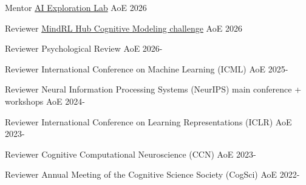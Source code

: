 
\begin{cvhonors}

 \cvhonor
    {Mentor} %
    {\href{https://ai-exploration-lab.vercel.app/}{AI Exploration Lab}} %
    {AoE} %
    {2026~~} %

    \cvhonor
    {Reviewer} %
    {\href{https://rldmjc.github.io/posts/modelingchallenge/#our-core-philosophy}{MindRL Hub Cognitive Modeling challenge}} %
    {AoE} %
    {2026~~} %

\cvhonor
    {Reviewer} %
    {Psychological Review} %
    {AoE} %
    {2026-} %
    
\cvhonor
    {Reviewer} %
    {International Conference on Machine Learning (ICML)} %
    {AoE} %
    {2025-} %

   \cvhonor
    {Reviewer} %
    {Neural Information Processing Systems (NeurIPS) main conference + workshops} %
    {AoE} %
    {2024-} %
    
  \cvhonor
    {Reviewer} %
    {International Conference on Learning Representations (ICLR)} %
    {AoE} %
    {2023-} %

    \cvhonor
    {Reviewer} %
    {Cognitive Computational Neuroscience (CCN)} %
    {AoE} %
    {2023-} %

    \cvhonor
    {Reviewer} %
    {Annual Meeting of the Cognitive Science Society (CogSci)} %
    {AoE} %
    {2022-} %
    
    \vspace{3mm}
\end{cvhonors}

